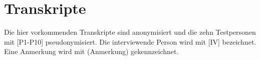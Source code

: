 \section{Transkripte}
Die hier vorkommenden Transkripte sind anonymisiert und die zehn Testpersonen mit [P1-P10] pseudonymisiert.
Die interviewende Person wird mit [IV] bezeichnet.
Eine Anmerkung wird mit (Anmerkung) gekennzeichnet.
